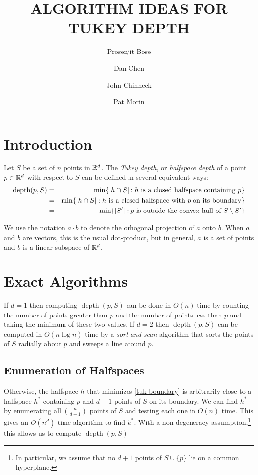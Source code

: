 \documentclass[lotsofwhite,12pt]{patmorin}
\title{\MakeUppercase{Algorithm Ideas for Tukey Depth}}
\author{Prosenjit Bose \and Dan Chen \and John Chinneck \and Pat Morin}
\DeclareMathOperator{\td}{depth}
\begin{document}
\maketitle

\section{Introduction}

Let $S$ be a set of $n$ points in $\mathbb{R}^d$.
The \emph{Tukey depth}, or \emph{halfspace depth} of a point $p\in\mathbb{R}^d$ with
respect to $S$ can be defined in several equivalent ways:
\begin{eqnarray}
\td(p,S) & = & \min\{ |h\cap S| :
                     \mbox{$h$ is a closed halfspace containing $p$} \} 
                       \eqlabel{tuk-orig} \\ 
            & = & \min\{ |h\cap S| :
                      \mbox{$h$ is a closed halfspace 
                            with $p$ on its boundary} \} 
                        \eqlabel{tuk-boundary} \\ 
            & = & \min\{ |S'| :
                      \mbox{$p$ is outside the convex hull of 
                           $S\setminus S'$} \}
                      \eqlabel{tuk-hull}
\end{eqnarray}

We use the notation $a\cdot b$ to denote the orhogonal projection of
$a$ onto $b$. When $a$ and $b$ are vectors, this is the usual
dot-product, but in general, $a$ is a set of points and $b$ is a
linear subspace of $\mathbb{R}^d$.


\section{Exact Algorithms}

If $d=1$ then computing $\td(p,S)$ can be done in $O(n)$ time by
counting the number of points greater than $p$ and the number of
points less than $p$ and taking the minimum of these two values.  If
$d=2$ then $\td(p,S)$ can be computed in $O(n\log n)$ time by
a \emph{sort-and-scan} algorithm that sorts the points of $S$ radially
about $p$ and sweeps a line around $p$.

\subsection{Enumeration of Halfspaces}

Otherwise, the halfspace $h$ that minimizes \eqref{tuk-boundary} is
arbitrarily close to a halfspace $h^*$ containing $p$ and $d-1$ points
of $S$ on its boundary.  We can find $h^*$ by enumerating all $n
\choose d-1$ points of $S$ and testing each one in $O(n)$ time. This
gives an $O(n^d)$ time algorithm to find $h^*$.  With a non-degeneracy
assumption,\footnote{In particular, we assume that no $d+1$ points of
$S\cup\{p\}$ lie on a common hyperplane.} this allows us to compute
$\td(p,S)$.
\end{document}
